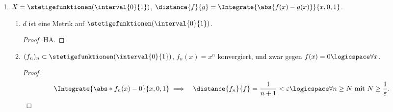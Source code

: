 \begin{beispiele}
\begin{enumerate}
\begin{enumerate}[label=\textbf{\arabic*. Beh}]
        \end{enumerate}
        \item \( X=\stetigefunktionen(\interval{0}{1}) \), \( \distance{f}{g}=\Integrate{\abs{f(x)-g(x)}}{x,0,1} \).
        \begin{enumerate}[label=\textbf{\arabic*. Beh}]
            
            \item \( d \) ist eine Metrik auf \( \stetigefunktionen(\interval{0}{1}) \).
            \begin{proof}
                HA\@.
            \end{proof}
            
            \item \( (f_n)_n\subset \stetigefunktionen(\interval{0}{1}) \), \( f_n(x)=x^n \) konvergiert, und zwar gegen \( f(x)=0\logicspace\forall x \).
            \begin{proof}
                \begin{align*}
                    &\Integrate{\abs*{f_n(x)-0}}{x,0,1}%
                    \implies &\distance{f_n}{f}=\frac{1}{n+1}<\varepsilon\logicspace\forall n\geq N \text{ mit } N \geq \frac{1}{\varepsilon}.
                \end{align*}
            \end{proof}
            
        \end{enumerate}
        
    \end{enumerate}
\end{beispiele}







